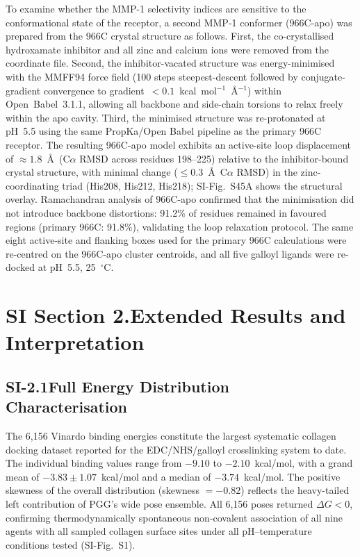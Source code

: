 \documentclass[11pt]{article}
\begin{document}
To examine whether the MMP-1 selectivity indices are sensitive to the
conformational state of the receptor, a second MMP-1 conformer (966C-apo)
was prepared from the 966C crystal structure as follows.
First, the co-crystallised hydroxamate inhibitor and all zinc and calcium
ions were removed from the coordinate file.
Second, the inhibitor-vacated structure was energy-minimised with the
MMFF94 force field (100 steps steepest-descent followed by conjugate-gradient
convergence to gradient~$< 0.1$~kcal~mol$^{-1}$~\AA$^{-1}$) within
Open~Babel~3.1.1, allowing all backbone and side-chain torsions to relax
freely within the apo cavity.
Third, the minimised structure was re-protonated at pH~5.5 using the same
PropKa/Open Babel pipeline as the primary 966C receptor.
The resulting 966C-apo model exhibits an active-site loop displacement of
$\approx 1.8$~\AA\ (C$\alpha$ RMSD across residues 198--225) relative to
the inhibitor-bound crystal structure, with minimal change
($\leq 0.3$~\AA\ C$\alpha$ RMSD) in the zinc-coordinating triad
(His208, His212, His218); SI-Fig.~S45A shows the structural overlay.
Ramachandran analysis of 966C-apo confirmed that the minimisation did not
introduce backbone distortions: 91.2\% of residues remained in favoured
regions (primary 966C: 91.8\%), validating the loop relaxation protocol.
The same eight active-site and flanking boxes used for the primary 966C
calculations were re-centred on the 966C-apo cluster centroids, and all
five galloyl ligands were re-docked at pH~5.5, 25~$^\circ$C.

\label{si:methods_end}

\section*{SI Section 2.\quad Extended Results and Interpretation}
\label{si:results}

\subsection*{SI-2.1\quad Full Energy Distribution Characterisation}

The 6,156 Vinardo binding energies constitute the largest systematic collagen
docking dataset reported for the EDC/NHS/galloyl crosslinking system to date.
The individual binding values range from $-9.10$ to $-2.10$~kcal/mol, with a
grand mean of $-3.83 \pm 1.07$~kcal/mol and a median of $-3.74$~kcal/mol.
The positive skewness of the overall distribution (skewness $= -0.82$) reflects
the heavy-tailed left contribution of PGG's wide pose ensemble.
All 6,156 poses returned $\Delta G < 0$, confirming thermodynamically spontaneous
non-covalent association of all nine agents with all sampled collagen surface
sites under all pH--temperature conditions tested (SI-Fig.~S1).
\end{document}
